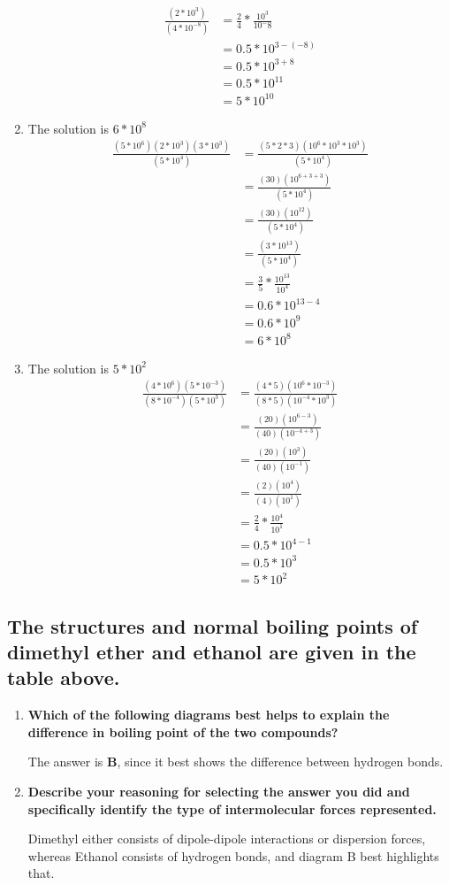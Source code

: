 \documentclass[11pt]{article}
\begin{document}
\begin{enumerate}
\begin{align*}
\frac{(2*10^3)}{(4*10^{-8})}&=\frac{2}{4}*\frac{10^3}{10^-8}\\
&=0.5*10^{3-(-8)}\\
&=0.5*10^{3+8}\\
&=0.5*10^11\\
&=5*10^{10}
\end{align*}
\item The solution is \(6*10^8\)
\begin{align*}
\frac{(5*10^6)(2*10^3)(3*10^3)}{(5*10^4)}&=\frac{(5*2*3)(10^6*10^3*10^3)}{(5*10^4)}\\
&=\frac{(30)(10^{6+3+3})}{(5*10^4)}\\
&=\frac{(30)(10^{12})}{(5*10^4)}\\
&=\frac{(3*10^{13})}{(5*10^4)}\\
&=\frac{3}{5}*\frac{10^{13}}{10^4}\\
&=0.6*10^{13-4}\\
&=0.6*10^9\\
&=6*10^8
\end{align*}
\item The solution is \(5*10^2^{}\)
\begin{align*}
\frac{(4*10^6)(5*10^{-3})}{(8*10^{-4})(5*10^3)}&=\frac{(4*5)(10^6*10^{-3})}{(8*5)(10^{-4}*10^3)}\\
&=\frac{(20)(10^{6-3}^{})}{(40)(10^{-4+3})}\\
&=\frac{(20)(10^3)}{(40)(10^{-1})}^{}\\
&=\frac{(2)(10^4)}{(4)(10^1)}^{}\\
&=\frac{2}{4}*\frac{10^4}{10^1}\\
&=0.5*10^{4-1}\\
&=0.5*10^3\\
&=5*10^2
\end{align*}
\end{enumerate}

\subsection{The structures and normal boiling points of dimethyl ether and ethanol are given in the table above.}
\label{sec:org756524c}
\begin{enumerate}
\item \textbf{Which of the following diagrams best helps to explain the difference in boiling point of the two compounds?}

The answer is \textbf{B}, since it best shows the difference between hydrogen bonds.

\item \textbf{Describe your reasoning for selecting the answer you did and specifically identify the type of intermolecular forces represented.}

Dimethyl either consists of dipole-dipole interactions or dispersion forces, whereas Ethanol consists of hydrogen bonds, and diagram B best highlights that.
\end{enumerate}
\end{document}
